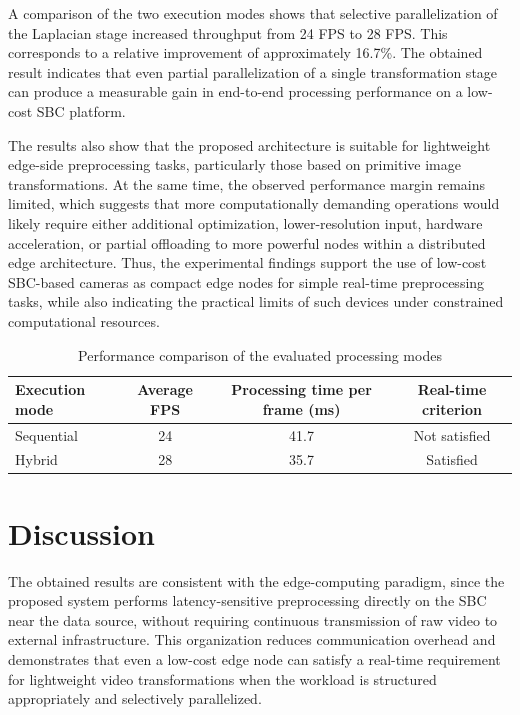 \documentclass[
]{ceurart}
\begin{document}
A comparison of the two execution modes shows that selective parallelization of the Laplacian stage increased throughput from 24 FPS to 28 FPS. This corresponds to a relative improvement of approximately 16.7\%. The obtained result indicates that even partial parallelization of a single transformation stage can produce a measurable gain in end-to-end processing performance on a low-cost SBC platform.

The results also show that the proposed architecture is suitable for lightweight edge-side preprocessing tasks, particularly those based on primitive image transformations. At the same time, the observed performance margin remains limited, which suggests that more computationally demanding operations would likely require either additional optimization, lower-resolution input, hardware acceleration, or partial offloading to more powerful nodes within a distributed edge architecture. Thus, the experimental findings support the use of low-cost SBC-based cameras as compact edge nodes for simple real-time preprocessing tasks, while also indicating the practical limits of such devices under constrained computational resources.

\begin{table}[ht]
	\centering
	\caption{Performance comparison of the evaluated processing modes}
	\label{tab:performance_comparison}
	\begin{tabular}{lccc}
		\hline
		\textbf{Execution mode} & \textbf{Average FPS} & \textbf{Processing time per frame (ms)} & \textbf{Real-time criterion} \\
		\hline
		Sequential & 24 & 41.7 & Not satisfied \\
		Hybrid     & 28 & 35.7 & Satisfied \\
		\hline
	\end{tabular}
\end{table}


\section{Discussion}

The obtained results are consistent with the edge-computing paradigm, since the proposed system performs latency-sensitive preprocessing directly on the SBC near the data source, without requiring continuous transmission of raw video to external infrastructure. This organization reduces communication overhead and demonstrates that even a low-cost edge node can satisfy a real-time requirement for lightweight video transformations when the workload is structured appropriately and selectively parallelized.
\end{document}
